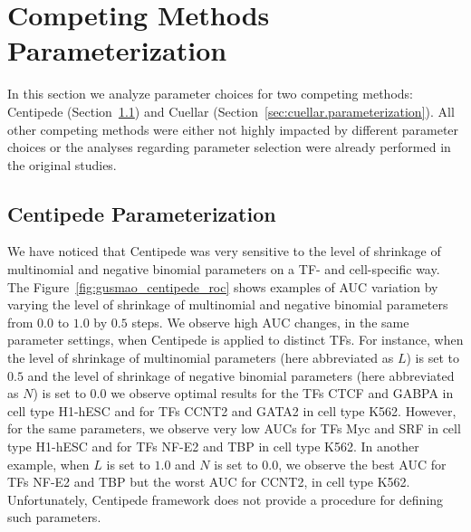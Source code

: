 \section{Competing Methods Parameterization}
\label{sec:competing.methods.parameterization}

In this section we analyze parameter choices for two competing methods: Centipede\cite{pique2011} (Section~\ref{sec:centipede.parameterization}) and Cuellar\cite{cuellar2012} (Section~\ref{sec:cuellar.parameterization}). All other competing methods were either not highly impacted by different parameter choices or the analyses regarding parameter selection were already performed in the original studies.

\subsection{Centipede Parameterization}
\label{sec:centipede.parameterization}

We have noticed that Centipede was very sensitive to the level of shrinkage of multinomial and negative binomial parameters on a TF- and cell-specific way. The Figure~\ref{fig:gusmao_centipede_roc} shows examples of AUC variation by varying the level of shrinkage of multinomial and negative binomial parameters from $ 0.0 $ to $ 1.0 $ by $ 0.5 $ steps. We observe high AUC changes, in the same parameter settings, when Centipede is applied to distinct TFs. For instance, when the level of shrinkage of multinomial parameters (here abbreviated as $L$) is set to $0.5$ and the level of shrinkage of negative binomial parameters (here abbreviated as $N$) is set to $0.0$ we observe optimal results for the TFs CTCF and GABPA in cell type H1-hESC and for TFs CCNT2 and GATA2 in cell type K562. However, for the same parameters, we observe very low AUCs for TFs Myc and SRF in cell type H1-hESC and for TFs NF-E2 and TBP in cell type K562. In another example, when $L$ is set to $1.0$ and $N$ is set to $0.0$, we observe the best AUC for TFs NF-E2 and TBP but the worst AUC for CCNT2, in cell type K562. Unfortunately, Centipede framework does not provide a procedure for defining such parameters.

